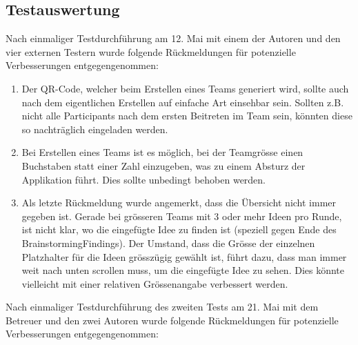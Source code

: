 \subsection{Testauswertung}
Nach einmaliger Testdurchführung am 12. Mai mit einem der Autoren und den vier externen Testern wurde folgende Rück\-mel\-dun\-gen für potenzielle Verbesserungen entgegengenommen:

\begin{enumerate}
	\item Der QR-Code, welcher beim Erstellen eines Teams generiert wird, sollte auch nach dem eigentlichen Erstellen auf einfache Art einsehbar sein. Sollten z.B. nicht alle Participants nach dem ersten Beitreten im Team sein, könnten diese so nachträglich eingeladen werden.
	\item Bei Erstellen eines Teams ist es möglich, bei der Teamgrösse einen Buchstaben statt einer Zahl einzugeben, was zu einem Absturz der Applikation führt. Dies sollte unbedingt behoben werden.
	\item Als letzte Rückmeldung wurde angemerkt, dass die Übersicht nicht immer gegeben ist. Gerade bei grösseren Teams mit 3 oder mehr Ideen pro Runde, ist nicht klar, wo die eingefügte Idee zu finden ist (speziell gegen Ende des BrainstormingFindings). Der Umstand, dass die Grösse der einzelnen Platzhalter für die Ideen grösszügig gewählt ist, führt dazu, dass man immer weit nach unten scrollen muss, um die eingefügte Idee zu sehen. Dies könnte vielleicht mit einer relativen Grössenangabe verbessert werden.
\end{enumerate}

Nach einmaliger Testdurchführung des zweiten Tests am 21. Mai mit dem Betreuer und den zwei Autoren wurde folgende Rück\-mel\-dun\-gen für potenzielle Verbesserungen entgegengenommen:

